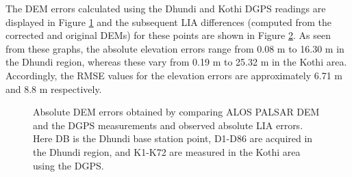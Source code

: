 \documentclass[review]{elsarticle}
\numberwithin{equation}{section}
\numberwithin{figure}{section}
\numberwithin{table}{section}
\begin{document}
The DEM errors calculated using the Dhundi and Kothi DGPS readings are displayed in Figure \ref{subfig:dem_error} and the subsequent LIA differences (computed from the corrected and original DEMs) for these points are shown in Figure \ref{subfig:lia_error}. As seen from these graphs, the absolute elevation errors range from 0.08 m to 16.30 m in the Dhundi region, whereas these vary from 0.19 m to 25.32 m in the Kothi area. Accordingly, the RMSE values for the elevation errors are approximately 6.71 m and 8.8 m respectively.

\begin{figure}[!t]
    \centering
    \begin{subfigure}[t]{\textwidth}
        \caption{}
        \label{subfig:dem_error}
    \end{subfigure}
    \begin{subfigure}[t]{\textwidth}
        \caption{}
        \label{subfig:lia_error}
    \end{subfigure}
    \caption{ Absolute DEM errors obtained by comparing ALOS PALSAR DEM and the DGPS measurements and  observed absolute LIA errors. Here DB is the Dhundi base station point, D1-D86 are acquired in the Dhundi region, and K1-K72 are measured in the Kothi area using the DGPS.}
    \label{fig:error}
\end{figure}
\end{document}
